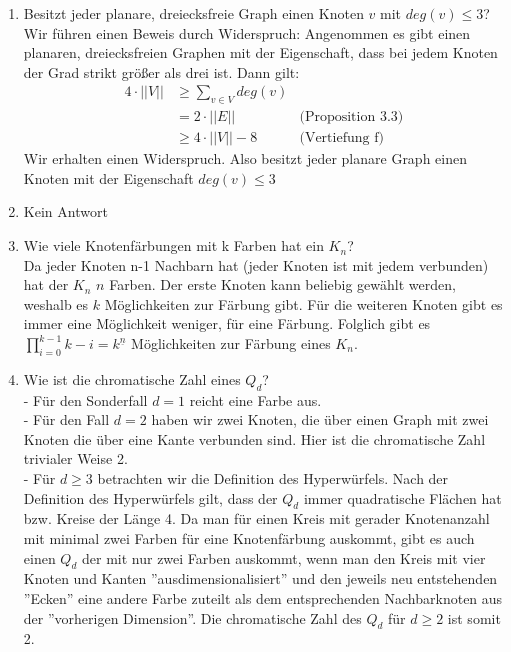 \begin{enumerate}[label=(\alph*)]
        \item Besitzt jeder planare, dreiecksfreie Graph einen Knoten $v$ mit $deg(v) \leq 3$? \\
        Wir führen einen Beweis durch Widerspruch: Angenommen es gibt einen planaren, dreiecksfreien 
        Graphen mit der Eigenschaft, dass bei jedem Knoten der Grad strikt größer als drei ist. Dann gilt: 
        \begin{align*}
            4 \cdot ||V|| &\geq \sum_{v \in V} deg(v)\\
            &= 2 \cdot ||E|| &\textrm{(Proposition 3.3)}\\
            &\geq 4 \cdot ||V|| - 8 &\textrm{(Vertiefung f)}
        \end{align*}
        Wir erhalten einen Widerspruch. Also besitzt jeder planare Graph einen Knoten mit der Eigenschaft $deg(v) \leq 3$
        
        \item Kein Antwort

        \item Wie viele Knotenfärbungen mit k Farben hat ein $K_n$? \\
        Da jeder Knoten n-1 Nachbarn hat (jeder Knoten ist mit jedem verbunden) hat der $K_n$ $n$ Farben. 
        Der erste Knoten kann beliebig gewählt werden, weshalb es $k$ Möglichkeiten zur Färbung gibt. 
        Für die weiteren Knoten gibt es immer eine Möglichkeit weniger, für eine Färbung. Folglich gibt es
        $\prod_{i=0}^{k-1} k - i = k^{\underline{n}}$ Möglichkeiten zur Färbung eines $K_n$.
          
        \item Wie ist die chromatische Zahl eines $Q_d$? \\
        - Für den Sonderfall $d = 1$ reicht eine Farbe aus. \\
        - Für den Fall $d = 2$ haben wir zwei Knoten, die über einen Graph mit zwei Knoten die über eine 
        Kante verbunden sind. Hier ist die chromatische Zahl trivialer Weise 2.\\
        - Für $d \geq 3$ betrachten wir die Definition des Hyperwürfels. Nach der Definition des 
        Hyperwürfels gilt, dass der $Q_d$ immer quadratische Flächen hat bzw. Kreise der Länge 4. 
        Da man für einen   Kreis mit gerader Knotenanzahl mit minimal zwei Farben für eine Knotenfärbung 
        auskommt, gibt es auch einen $Q_d$ der mit nur zwei Farben auskommt, wenn man den Kreis mit vier 
        Knoten und Kanten ''ausdimensionalisiert'' und den jeweils neu entstehenden ''Ecken'' eine 
        andere Farbe zuteilt als dem entsprechenden Nachbarknoten aus der ''vorherigen Dimension''. 
        Die chromatische Zahl des $Q_d$ für $d \geq 2$ ist somit 2.
        
    \end{enumerate}
